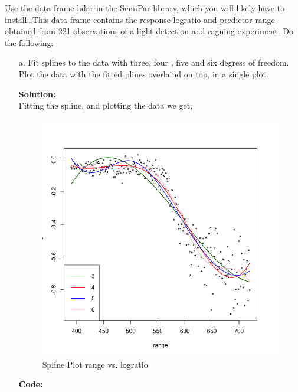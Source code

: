 \documentclass[12pt]{article}
\makeatletter
\theoremstyle{homework}
\newenvironment{exercise}[1]
{\def\@currentlabel{#1}\exercisecore}
{\endexercisecore}
\newcommand{\localhead}[1]{\par\smallskip\noindent\textbf{#1}\nobreak\\}%
\newcommand\solution{\localhead{Solution:}}
\makeatother
\begin{document}
 \begin{exercise}{2} Use the data frame lidar in the SemiPar library, which you will likely have to install\dots This data 
  frame contains the response logratio and predictor range obtained from 221 observations of a light detection and ragning experiment. Do the following: 
  \begin{enumerate}
    \item[a.] Fit splines to the data with three, four , five and six degress of freedom. Plot the data with the fitted plines overlaind on top, in a 
    single plot.\\
    \solution  Fitting the spline, and plotting the data we get, 
    \begin{figure}[H]
      \begin{center}
        \caption{Spline Plot range vs. logratio}
      \includegraphics[width = 1\textwidth]{Rplot01.png}
      \end{center}
    \end{figure}
    \textbf{Code:}
    \begin{center}
    
    \end{center} 
    \newpage


\end{enumerate}
\end{exercise}
\end{document}

